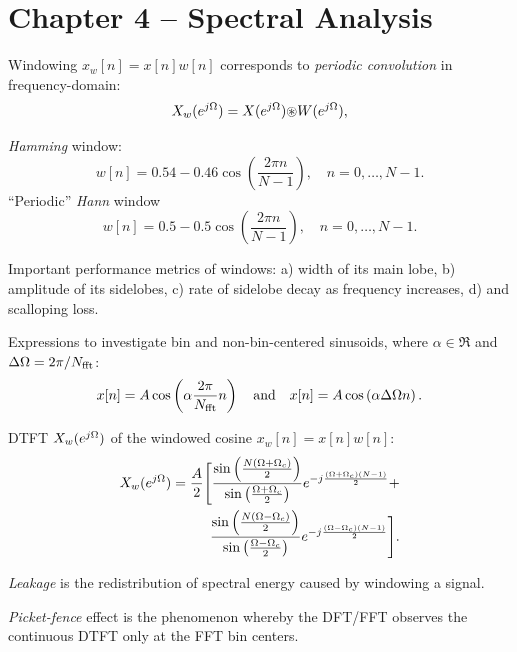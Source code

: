\section*{Chapter 4 -- Spectral Analysis}


Windowing $x_w[n] = x[n] w[n]$ corresponds to \emph{periodic convolution} in frequency-domain:
\begin{equation}
X_w(e^{j {\Omega}}) = X(e^{j {\Omega}}) {\circledast} W(e^{j {\Omega}}),
\label{eq:freq_domain_windowing}
\end{equation}

\emph{Hamming} window:
\begin{equation}
w[n] = 0.54 - 0.46 \cos \left( \frac{2 \pi n}{N-1} \right), \textrm{~~~}n=0,\ldots,N-1.
\label{eq:hammingWindow}
\end{equation}
``Periodic'' \emph{Hann} window
\begin{equation}
w[n] = 0.5 - 0.5 \cos \left( \frac{2 \pi n}{N-1} \right), \textrm{~~~}n=0,\ldots,N-1.
\label{eq:hannWindow}
\end{equation}

Important performance metrics of windows: a) width of its main lobe,
	b) amplitude of its sidelobes,
	c) rate of sidelobe decay as frequency increases,
	d) and scalloping loss.

Expressions to investigate bin and non-bin-centered sinusoids, where $\alpha \in \Re$ and $\Delta {\Omega} = 2 \pi / {N_{\textrm{fft}}}$:
\begin{equation}
x[n]=A \cos \left( \alpha \frac{2 \pi }{{N_{\textrm{fft}}}}n \right) \textrm{~~~and~~~}
x[n]= A\cos \left( \alpha \Delta {\Omega} n \right).
\end{equation}


DTFT $X_w(e^{j {\Omega}})$ of the windowed cosine $x_w[n]=x[n] w[n]$:
	\begin{equation}
	\begin{aligned}
	X_w(e^{j {\Omega}}) = \frac{A}{2} \Bigg[ \frac{\sin \left( \frac{N({\Omega} + {\Omega}_c)}{2} \right) }{\sin \left( \frac{{\Omega} + {\Omega}_c}{2}\right) } e^{-j\frac{({\Omega} + {\Omega}_c)(N-1)}{2}} + \\
	\frac{\sin \left( \frac{N({\Omega} - {\Omega}_c)}{2} \right) }{\sin \left( \frac{{\Omega} - {\Omega}_c}{2}\right) } e^{-j\frac{({\Omega} - {\Omega}_c)(N-1)}{2}} \Bigg].
	\label{eq:dtftWindowedCosine}
	\end{aligned}
\end{equation}

\emph{Leakage} is the redistribution of spectral energy caused by windowing a signal.

\emph{Picket-fence} effect is the phenomenon whereby the DFT/FFT observes the continuous DTFT only at the FFT bin centers.

